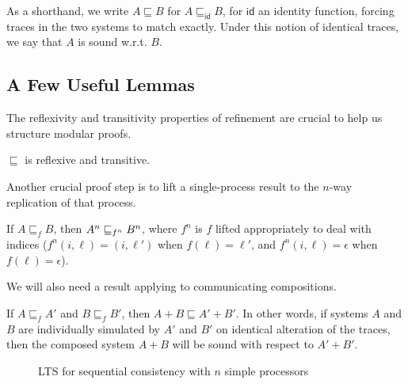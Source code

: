 As a shorthand, we write $A \sqsubseteq B$ for $A \sqsubseteq_\mathsf{id} B$,
for $\mathsf{id}$ an identity function, forcing traces in the two systems to
match exactly. Under this notion of identical traces, we say that $A$
is sound w.r.t. $B$.

\subsection{A Few Useful Lemmas}

The reflexivity and transitivity properties of refinement are crucial to help us
structure modular proofs.

\begin{theorem}\label{transitive}
$\sqsubseteq$ is reflexive and transitive.
\end{theorem}

Another crucial proof step is to lift a single-process result to the $n$-way
replication of that process.

\begin{theorem}\label{liftn}
If $A \sqsubseteq_f B$, then $\smulti{n}{A} \sqsubseteq_{f^n} \smulti{n}{B}$, where
$f^n$ is $f$ lifted appropriately to deal with indices ($f^n(i, \ell) =
(i, \ell')$ when $f(\ell) = \ell'$, and $f^n(i, \ell) = \epsilon$ when
$f(\ell) = \epsilon$).
\end{theorem}

We will also need a result applying to communicating compositions.

\begin{theorem}\label{liftplus}
If $A \sqsubseteq_f A'$ and $B \sqsubseteq_f B'$, then $A + B \sqsubseteq A' +
B'$. In other words, if systems $A$ and $B$ are individually simulated by $A'$ and
$B'$ on identical alteration of the traces, then the composed
system $A+B$ will be sound with respect to $A'+B'$.
\end{theorem}

\begin{figure}
\small
\centering
\begin{boxedminipage}[c]{.48\textwidth}
{}
{}

{}

{}

{}
\end{boxedminipage}
\caption{LTS for sequential consistency with $n$ simple processors}
\label{Ref}
\end{figure}

